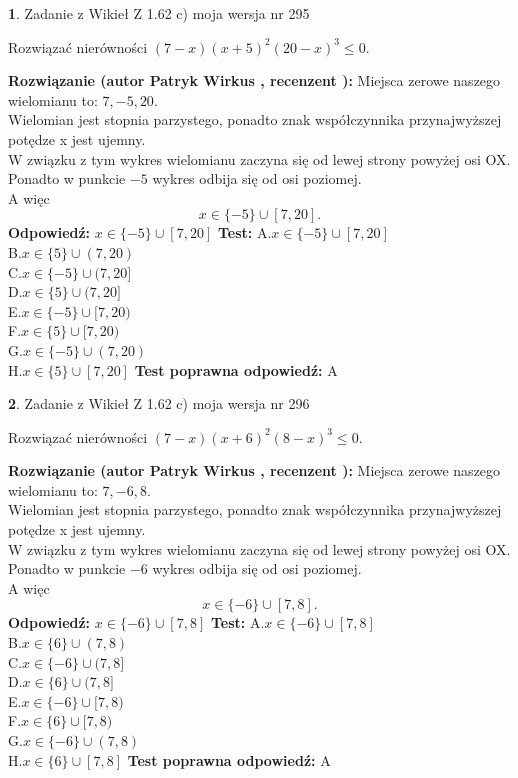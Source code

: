 \documentclass[12pt, a4paper]{article}
\theoremstyle{definition} %
\newtheorem{zad}{}
\newcommand{\zadStart}[1]{\begin{zad}#1\newline}
\newcommand{\zadStop}{\end{zad}}
\newcommand{\rozwStart}[2]{\noindent \textbf{Rozwiązanie (autor #1 , recenzent #2): }\newline}
\newcommand{\rozwStop}{\newline}
\newcommand{\odpStart}{\noindent \textbf{Odpowiedź:}\newline}
\newcommand{\odpStop}{\newline}
\newcommand{\testStart}{\noindent \textbf{Test:}\newline}
\newcommand{\testStop}{\newline}
\newcommand{\kluczStart}{\noindent \textbf{Test poprawna odpowiedź:}\newline}
\newcommand{\kluczStop}{\newline}
\begin{document}
\zadStart{Zadanie z Wikieł Z 1.62 c) moja wersja nr 295}

Rozwiązać nierówności $(7-x)(x+5)^{2}(20-x)^{3}\le0$.
\zadStop
\rozwStart{Patryk Wirkus}{}
Miejsca zerowe naszego wielomianu to: $7, -5, 20$.\\
Wielomian jest stopnia parzystego, ponadto znak współczynnika przy\linebreak najwyższej potędze x jest ujemny.\\ W związku z tym wykres wielomianu zaczyna się od lewej strony powyżej osi OX.\\
Ponadto w punkcie $-5$ wykres odbija się od osi poziomej.\\
A więc $$x \in \{-5\} \cup [7,20].$$
\rozwStop
\odpStart
$x \in \{-5\} \cup [7,20]$
\odpStop
\testStart
A.$x \in \{-5\} \cup [7,20]$\\
B.$x \in \{5\} \cup (7,20)$\\
C.$x \in \{-5\} \cup (7,20]$\\
D.$x \in \{5\} \cup (7,20]$\\
E.$x \in \{-5\} \cup [7,20)$\\
F.$x \in \{5\} \cup [7,20)$\\
G.$x \in \{-5\} \cup (7,20)$\\
H.$x \in \{5\} \cup [7,20]$
\testStop
\kluczStart
A
\kluczStop



\zadStart{Zadanie z Wikieł Z 1.62 c) moja wersja nr 296}

Rozwiązać nierówności $(7-x)(x+6)^{2}(8-x)^{3}\le0$.
\zadStop
\rozwStart{Patryk Wirkus}{}
Miejsca zerowe naszego wielomianu to: $7, -6, 8$.\\
Wielomian jest stopnia parzystego, ponadto znak współczynnika przy\linebreak najwyższej potędze x jest ujemny.\\ W związku z tym wykres wielomianu zaczyna się od lewej strony powyżej osi OX.\\
Ponadto w punkcie $-6$ wykres odbija się od osi poziomej.\\
A więc $$x \in \{-6\} \cup [7,8].$$
\rozwStop
\odpStart
$x \in \{-6\} \cup [7,8]$
\odpStop
\testStart
A.$x \in \{-6\} \cup [7,8]$\\
B.$x \in \{6\} \cup (7,8)$\\
C.$x \in \{-6\} \cup (7,8]$\\
D.$x \in \{6\} \cup (7,8]$\\
E.$x \in \{-6\} \cup [7,8)$\\
F.$x \in \{6\} \cup [7,8)$\\
G.$x \in \{-6\} \cup (7,8)$\\
H.$x \in \{6\} \cup [7,8]$
\testStop
\kluczStart
A
\kluczStop
\end{document}
